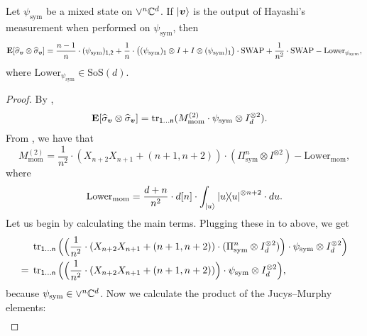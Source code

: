 \documentclass{article}
\newcommand{\symsep}{\mathrm{SoS}}
\newcommand{\swap}{\mathrm{SWAP}}
\newcommand{\reg}[1]{\mathsf{#1}}
\begin{document}
\begin{lemma}\label{lem:second-moment-gps}
    Let $\psi_{\mathrm{sym}}$ be a mixed state on $\lor^n \mathbb C^d$.
    If $\ket{\boldsymbol{v}}$ is the output of Hayashi's measurement when performed on $\psi_{\mathrm{sym}}$, then
    \begin{equation*}
    \E[\widehat{\sigma}_{\bv} \otimes \widehat{\sigma}_{\bv}]=
         \frac{n-1}{n} \cdot (\psi_{\mathrm{sym}})_{\reg{1},\reg{2}} + \frac{1}{n} \cdot \big((\psi_{\mathrm{sym}})_{\reg{1}} \otimes I + I \otimes (\psi_{\mathrm{sym}})_{\reg{1}}\big) \cdot \swap + \frac{1}{n^2} \cdot \swap - \mathrm{Lower}_{\psi_{\mathrm{sym}}},
    \end{equation*}
    where $\mathrm{Lower}_{\psi_{\mathrm{sym}}} \in \symsep(d)$.
\end{lemma}
\begin{proof}
By ,
\begin{align}\label{eq:2nd-mom}
    \E[\widehat{\sigma}_{\bv}\otimes \widehat{\sigma}_{\bv}]
    &= \tr_{\reg{1}\dots\reg{n}}(M_{\mathrm{mom}}^{(2)} \cdot \psi_{\mathrm{sym}} \otimes I_d^{\otimes 2}).
\end{align}
From , we have that
\begin{equation*}
    M_{\mathrm{mom}}^{(2)} = \frac{1}{n^2} \cdot (X_{n+2}X_{n+1} + (n+1, n+2)) \cdot (\Pi_{\mathrm{sym}}^n \otimes I^{\otimes 2}) - \mathrm{Lower}_{\mathrm{mom}},
    \end{equation*}
    where
    \begin{equation*}
        \mathrm{Lower}_{\mathrm{mom}} = \frac{d+n}{n^2} \cdot d[n] \cdot \int_{\ket{u}} \ketbra{u}^{\otimes n + 2} \cdot du.
    \end{equation*}
    Let us begin by calculating the main terms. Plugging these in to  above, we get
    \begin{align}
        &\tr_{\reg{1}\dots\reg{n}}\Big(\Big(\frac{1}{n^2} \cdot (X_{n+2}X_{n+1} + (n+1, n+2)) \cdot (\Pi_{\mathrm{sym}}^n \otimes I_d^{\otimes 2})\Big) \cdot \psi_{\mathrm{sym}} \otimes I_d^{\otimes 2}\Big)\nonumber\\
        ={}& \tr_{\reg{1}\dots\reg{n}}\Big(\Big(\frac{1}{n^2} \cdot (X_{n+2}X_{n+1} + (n+1, n+2))\Big) \cdot \psi_{\mathrm{sym}} \otimes I_d^{\otimes 2}\Big),\label{eq:main-term}
    \end{align}
    because $\psi_{\mathrm{sym}} \in \lor^n \mathbb C^d$.
    Now we calculate the product of the Jucys--Murphy elements:
    \begin{align*}

\end{align*}
\end{proof}
\end{document}
